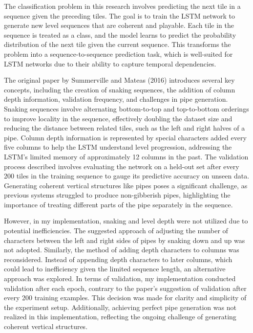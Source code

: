 \documentclass[runningheads]{llncs}
\begin{document}
The classification problem in this research involves predicting the next tile in a sequence given the preceding tiles. The goal is to train the LSTM network to generate new level sequences that are coherent and playable. Each tile in the sequence is treated as a class, and the model learns to predict the probability distribution of the next tile given the current sequence. This transforms the problem into a sequence-to-sequence prediction task, which is well-suited for LSTM networks due to their ability to capture temporal dependencies.

The original paper by Summerville and Mateas (2016) introduces several key concepts, including the creation of snaking sequences, the addition of column depth information, validation frequency, and challenges in pipe generation. Snaking sequences involve alternating bottom-to-top and top-to-bottom orderings to improve locality in the sequence, effectively doubling the dataset size and reducing the distance between related tiles, such as the left and right halves of a pipe. Column depth information is represented by special characters added every five columns to help the LSTM understand level progression, addressing the LSTM's limited memory of approximately 12 columns in the past. The validation process described involves evaluating the network on a held-out set after every 200 tiles in the training sequence to gauge its predictive accuracy on unseen data. Generating coherent vertical structures like pipes poses a significant challenge, as previous systems struggled to produce non-gibberish pipes, highlighting the importance of treating different parts of the pipe separately in the sequence.

However, in my implementation, snaking and level depth were not utilized due to potential inefficiencies. The suggested approach of adjusting the number of characters between the left and right sides of pipes by snaking down and up was not adopted. Similarly, the method of adding depth characters to columns was reconsidered. Instead of appending depth characters to later columns, which could lead to inefficiency given the limited sequence length, an alternative approach was explored. In terms of validation, my implementation conducted validation after each epoch, contrary to the paper's suggestion of validation after every 200 training examples. This decision was made for clarity and simplicity of the experiment setup. Additionally, achieving perfect pipe generation was not realized in this implementation, reflecting the ongoing challenge of generating coherent vertical structures.
\end{document}
